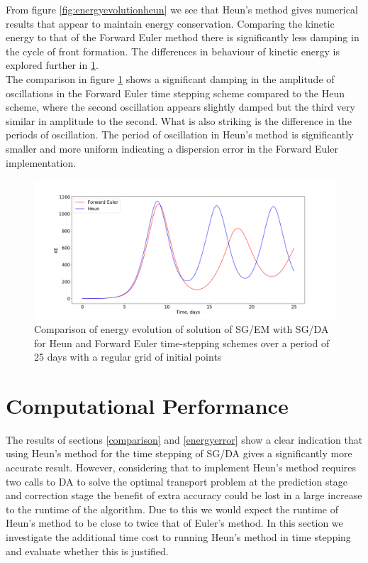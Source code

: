 From figure \ref{fig:energyevolutionheun} we see that Heun's method gives numerical results that appear to maintain energy conservation. Comparing the kinetic energy to that of the Forward Euler method there is significantly less damping in the cycle of front formation. The differences in behaviour of kinetic energy is explored further in \ref{fig:energyeulerheuncomparison}.
\\
\linebreak
The comparison in figure \ref{fig:energyeulerheuncomparison} shows a significant damping in the amplitude of oscillations in the Forward Euler time stepping scheme compared to the Heun scheme, where the second oscillation appears slightly damped but the third very similar in amplitude to the second. What is also striking is the difference in the periods of oscillation. The period of oscillation in Heun's method is significantly smaller and more uniform indicating a dispersion error in the Forward Euler implementation. 
\begin{figure}[h!]
	\centering
	\includegraphics[width=0.9\linewidth]{evaluation/energy_euler_heun_comparison}
	\caption[Comparison of Energy Evolution for SG/DA with Heun/Forward Euler Time Stepping Schemes]{Comparison of energy evolution of solution of SG/EM with SG/DA for Heun and Forward Euler time-stepping schemes over a period of 25 days with a regular grid of initial points}
	\label{fig:energyeulerheuncomparison}
\end{figure}

\newpage
\section{Computational Performance}
The results of sections \ref{comparison} and \ref{energyerror} show a clear indication that using Heun's method for the time stepping of SG/DA gives a significantly more accurate result. However, considering that to implement Heun's method requires two calls to DA to solve the optimal transport problem at the prediction stage and correction stage the benefit of extra accuracy could be lost in a large increase to the runtime of the algorithm. Due to this we would expect the runtime of Heun's method to be close to twice that of Euler's method. In this section we investigate the additional time cost to running Heun's method in time stepping and evaluate whether this is justified.

